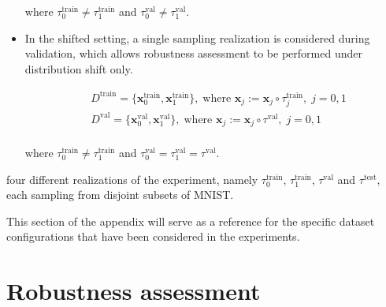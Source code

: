 \begin{definition}
\begin{itemize}
        where $\tau_0^{\text{train}} \neq \tau_1^{\text{train}}$ and $\tau_0^{\text{val}} \neq \tau_1^{\text{val}}$.

        \item In the shifted setting, a single sampling realization is considered during validation, which 
        allows robustness assessment to be performed under distribution shift only.

        $$
        \begin{aligned}
            &D^{\text{train}} = \{\bm{x}_0^{\text{train}}, \bm{x}_1^{\text{train}}\}, \; \text{where } \bm{x}_j := \bm{x}_j \circ \tau_j^{\text{train}}, \;j = 0,1 \\
            &D^{\text{val}} = \{\bm{x}_0^{\text{val}}, \bm{x}_1^{\text{val}}\}, \; \text{where } \bm{x}_j := \bm{x}_j \circ \tau^{\text{val}}, \;j=0,1 \\
        \end{aligned}
        $$

        where $\tau_0^{\text{train}} \neq \tau_1^{\text{train}}$ and $\tau_0^{\text{val}} = \tau_1^{\text{val}} =  \tau^{\text{val}}$.

    

    \end{itemize}

    four different realizations of the experiment, namely $\tau_0^{\text{train}}$, $\tau_1^{\text{train}}$, $\tau^{\text{val}}$
    and $\tau^{\text{test}}$, each sampling from disjoint subsets of MNIST. 
\end{definition}

This section of the appendix will serve as a reference for the specific dataset configurations that 
have been considered in the experiments.

\section{Robustness assessment}

